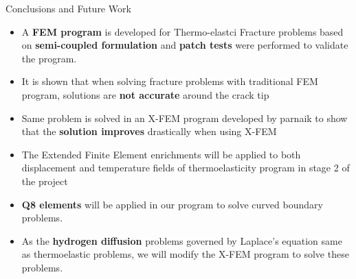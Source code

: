 \documentclass{beamer}
\begin{document}
\begin{frame}[t,fragile]{Conclusions and Future Work}
    \vspace{-.2cm}
    \footnotesize
\begin{itemize}
          \item A \textbf{FEM program} is developed for Thermo-elastci Fracture problems based on \textbf{semi-coupled formulation} and \textbf{patch tests} were performed to validate the program.
        \item It is shown that when solving fracture problems with traditional FEM program, solutions are \textbf{not accurate} around the crack tip
         \item Same problem is solved in an X-FEM program developed by parnaik to show that the \textbf{solution improves} drastically when using X-FEM
        \item The Extended Finite Element enrichments will be applied to both displacement and temperature fields of thermoelasticity program in stage 2 of the project  
         \item \textbf{Q8 elements} will be applied in our program to solve curved boundary problems. 
         \item As the \textbf{hydrogen diffusion} problems governed by Laplace's equation same as thermoelastic problems, we will modify the X-FEM program to solve these problems. 
    \end{itemize}
\end{frame}
\end{document}
